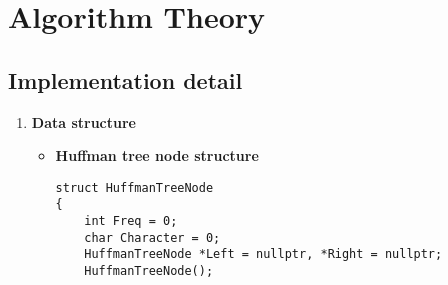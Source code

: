 \section{Algorithm Theory}
\subsection{Implementation detail}
\begin{enumerate}[label=\textbf{\Alph*.}]
    \item \textbf{Data structure}
    \begin{itemize}
        \item \textbf{Huffman tree node structure}
        \begin{verbatim}
struct HuffmanTreeNode
{
    int Freq = 0;
    char Character = 0;    
    HuffmanTreeNode *Left = nullptr, *Right = nullptr; 
    HuffmanTreeNode();


\end{verbatim}
\end{itemize}
\end{enumerate}
